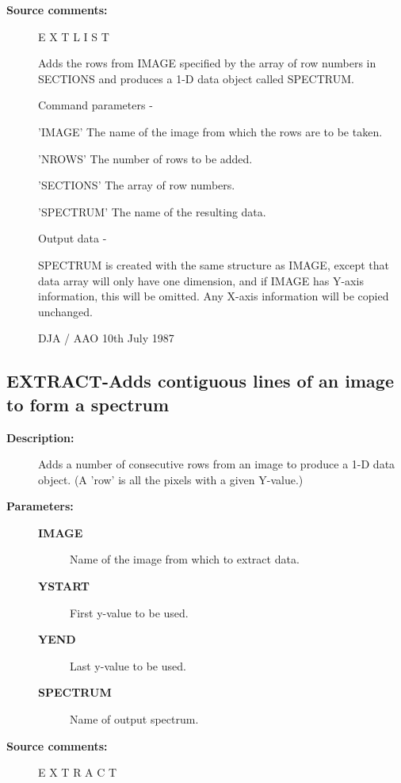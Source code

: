 \begin{description}
\begin{description}
\item [\textbf{Source comments:}]
\begin{terminalv}
 E X T L I S T

 Adds the rows from IMAGE specified by the array of row numbers
 in SECTIONS and produces a 1-D data object called SPECTRUM.

 Command parameters -

 'IMAGE'    The name of the image from which the rows
             are to be taken.

 'NROWS'    The number of rows to be added.

 'SECTIONS' The array of row numbers.

 'SPECTRUM' The name of the resulting data.

 Output data -

 SPECTRUM is created with the same structure as IMAGE,
 except that data array will only have one dimension, and if
 IMAGE has Y-axis information, this will be omitted.  Any X-axis
 information will be copied unchanged.

                               DJA / AAO 10th July 1987
\end{terminalv}
\end{description}
\subsection{EXTRACT-\label{EXTRACT}Adds contiguous lines of an image to form a spectrum}
\begin{description}

\item [\textbf{Description:}]
 Adds a number of consecutive rows from an image to produce a 1-D data
 object.  (A 'row' is all the pixels with a given Y-value.)

\item [\textbf{Parameters:}]
\begin{description}
\item [\textbf{IMAGE}]
 Name of the image from which to extract data.
\item [\textbf{YSTART}]
 First y-value to be used.
\item [\textbf{YEND}]
 Last y-value to be used.
\item [\textbf{SPECTRUM}]
 Name of output spectrum.
\end{description}

\item [\textbf{Source comments:}]
\begin{terminalv}
 E X T R A C T


\end{terminalv}
\end{description}
\end{description}

